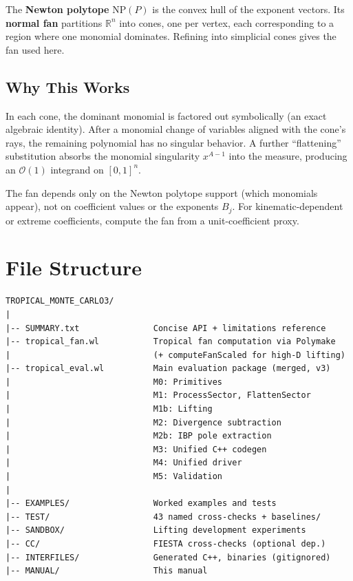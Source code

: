 \documentclass[11pt,a4paper]{article}
\begin{document}
The \textbf{Newton polytope} $\mathrm{NP}(P)$ is the convex hull of the exponent vectors. Its \textbf{normal fan} partitions $\mathbb{R}^n$ into cones, one per vertex, each corresponding to a region where one monomial dominates. Refining into simplicial cones gives the fan used here.

\subsection{Why This Works}

In each cone, the dominant monomial is factored out symbolically (an exact algebraic identity). After a monomial change of variables aligned with the cone's rays, the remaining polynomial has no singular behavior. A further ``flattening'' substitution absorbs the monomial singularity $x^{A-1}$ into the measure, producing an $\mathcal{O}(1)$ integrand on $[0,1]^n$.

The fan depends only on the Newton polytope support (which monomials appear), not on coefficient values or the exponents $B_j$. For kinematic-dependent or extreme coefficients, compute the fan from a unit-coefficient proxy.

\section{File Structure}

\begin{lstlisting}
TROPICAL_MONTE_CARLO3/
|
|-- SUMMARY.txt               Concise API + limitations reference
|-- tropical_fan.wl           Tropical fan computation via Polymake
|                             (+ computeFanScaled for high-D lifting)
|-- tropical_eval.wl          Main evaluation package (merged, v3)
|                             M0: Primitives
|                             M1: ProcessSector, FlattenSector
|                             M1b: Lifting
|                             M2: Divergence subtraction
|                             M2b: IBP pole extraction
|                             M3: Unified C++ codegen
|                             M4: Unified driver
|                             M5: Validation
|
|-- EXAMPLES/                 Worked examples and tests
|-- TEST/                     43 named cross-checks + baselines/
|-- SANDBOX/                  Lifting development experiments
|-- CC/                       FIESTA cross-checks (optional dep.)
|-- INTERFILES/               Generated C++, binaries (gitignored)
|-- MANUAL/                   This manual
\end{lstlisting}
\end{document}
